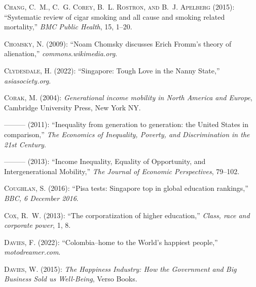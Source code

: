 \documentclass[10pt, letterpaper]{article}
\begin{document}
\begin{spacing}{2}
\begin{thebibliography}{120}
\textsc{Chang, C.~M., C.~G. Corey, B.~L. Rostron, and B.~J. Apelberg} (2015):
  \enquote{Systematic review of cigar smoking and all cause and smoking related
  mortality,} \emph{BMC Public Health}, 15, 1--20.

\textsc{Chomsky, N.} (2009): \enquote{Noam Chomsky discusses Erich Fromm's
  theory of alienation,} \emph{commons.wikimedia.org}.

\textsc{Clydesdale, H.} (2022): \enquote{Singapore: Tough Love in the Nanny
  State,} \emph{asiasociety.org}.

\textsc{Corak, M.} (2004): \emph{Generational income mobility in North America
  and Europe}, Cambridge University Press, New York NY.

---\hspace{-.1pt}---\hspace{-.1pt}--- (2011): \enquote{Inequality from
  generation to generation: the United States in comparison,} \emph{The
  Economics of Inequality, Poverty, and Discrimination in the 21st Century}.

---\hspace{-.1pt}---\hspace{-.1pt}--- (2013): \enquote{Income Inequality,
  Equality of Opportunity, and Intergenerational Mobility,} \emph{The Journal
  of Economic Perspectives}, 79--102.

\textsc{Coughlan, S.} (2016): \enquote{Pisa tests: Singapore top in global
  education rankings,} \emph{BBC, 6 December 2016}.

\textsc{Cox, R.~W.} (2013): \enquote{The corporatization of higher education,}
  \emph{Class, race and corporate power}, 1, 8.

\textsc{Davies, F.} (2022): \enquote{Colombia--home to the World's happiest
  people,} \emph{motodreamer.com}.

\textsc{Davies, W.} (2015): \emph{The Happiness Industry: How the Government
  and Big Business Sold us Well-Being}, Verso Books.


\end{thebibliography}
\end{spacing}
\end{document}
